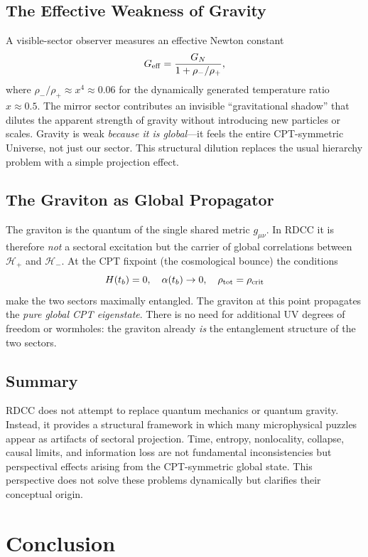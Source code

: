 \documentclass[11pt,a4paper]{article}
\begin{document}
\subsection{The Effective Weakness of Gravity}
A visible-sector observer measures an effective Newton constant
\[
G_{\rm eff} = \frac{G_N}{1 + \rho_- / \rho_+},
\]
where $\rho_-/\rho_+ \approx x^4 \approx 0.06$ for the dynamically generated temperature ratio $x \approx 0.5$. The mirror sector contributes an invisible ``gravitational shadow'' that dilutes the apparent strength of gravity without introducing new particles or scales. Gravity is weak \emph{because it is global}---it feels the entire CPT-symmetric Universe, not just our sector. This structural dilution replaces the usual hierarchy problem with a simple projection effect.

\subsection{The Graviton as Global Propagator}
The graviton is the quantum of the single shared metric $g_{\mu\nu}$. In RDCC it is therefore \emph{not} a sectoral excitation but the carrier of global correlations between $\mathcal{H}_+$ and $\mathcal{H}_-$. At the CPT fixpoint (the cosmological bounce) the conditions
\[
H(t_b) = 0, \quad \alpha(t_b) \to 0, \quad \rho_{\rm tot} = \rho_{\rm crit}
\]
make the two sectors maximally entangled. The graviton at this point propagates the \emph{pure global CPT eigenstate}. There is no need for additional UV degrees of freedom or wormholes: the graviton already \emph{is} the entanglement structure of the two sectors.

\subsection{Summary}

RDCC does not attempt to replace quantum mechanics or quantum gravity. Instead, it provides a structural framework in which many microphysical puzzles appear as artifacts of sectoral projection. Time, entropy, nonlocality, collapse, causal limits, and information loss are not fundamental inconsistencies but perspectival effects arising from the CPT-symmetric global state. This perspective does not solve these problems dynamically but clarifies their conceptual origin.

\section{Conclusion}
\end{document}
